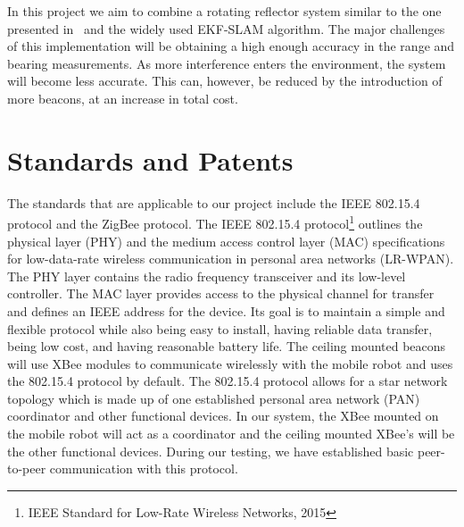\documentclass[letterpaper,12pt]{article}   %
\begin{document}
In this project we aim to combine a rotating reflector system similar to the one presented in~\cite{Hood2011} and the widely used EKF-SLAM algorithm. The major challenges of this implementation will be obtaining a high enough accuracy in the range and bearing measurements. As more interference enters the environment, the system will become less accurate. This can, however, be reduced by the introduction of more beacons, at an increase in total cost.


\section{Standards and Patents}
The standards that are applicable to our project include the IEEE 802.15.4 protocol and the ZigBee protocol. The IEEE 802.15.4 protocol\footnote{IEEE Standard for Low-Rate Wireless Networks, 2015} outlines the physical layer (PHY) and the medium access control layer (MAC) specifications for low-data-rate wireless communication in personal area networks (LR-WPAN). The PHY layer contains the radio frequency transceiver and its low-level controller. The MAC layer provides access to the physical channel for transfer and defines an IEEE address for the device. Its goal is to maintain a simple and flexible protocol while also being easy to install, having reliable data transfer, being low cost, and having reasonable battery life. The ceiling mounted beacons will use XBee modules to communicate wirelessly with the mobile robot and uses the 802.15.4 protocol by default. The 802.15.4 protocol allows for a star network topology which is made up of one established personal area network (PAN) coordinator and other functional devices. In our system, the XBee mounted on the mobile robot will act as a coordinator and the ceiling mounted XBee’s will be the other functional devices. During our testing, we have established basic peer-to-peer communication with this protocol.\\
\end{document}
